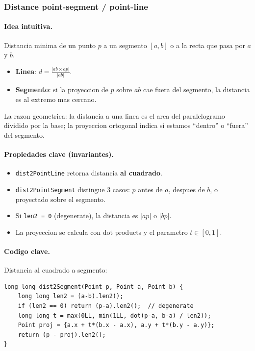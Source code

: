 ﻿\subsubsection{Distance point-segment / point-line}

\paragraph{Idea intuitiva.}
Distancia minima de un punto $p$ a un segmento $[a, b]$ o a la recta que pasa por $a$ y $b$.
\begin{itemize}\setlength\itemsep{0pt}
	\item \textbf{Linea}: $d = \frac{|ab \times ap|}{|ab|}$.
	\item \textbf{Segmento}: si la proyeccion de $p$ sobre $ab$ cae fuera del segmento, la distancia es al extremo mas cercano.
\end{itemize}
La razon geometrica: la distancia a una linea es el area del paralelogramo dividido por la base; la proyeccion ortogonal indica si estamos ``dentro'' o ``fuera'' del segmento.

\paragraph{Propiedades clave (invariantes).}
\begin{itemize}\setlength\itemsep{0pt}
	\item \texttt{dist2PointLine} retorna distancia \textbf{al cuadrado}.
	\item \texttt{dist2PointSegment} distingue 3 casos: $p$ antes de $a$, despues de $b$, o proyectado sobre el segmento.
	\item Si \texttt{len2 = 0} (degenerate), la distancia es $|ap|$ o $|bp|$.
	\item La proyeccion se calcula con dot products y el parametro $t \in [0, 1]$.
\end{itemize}

\paragraph{Codigo clave.}
Distancia al cuadrado a segmento:
\begin{verbatim}
long long dist2Segment(Point p, Point a, Point b) {
    long long len2 = (a-b).len2();
    if (len2 == 0) return (p-a).len2();  // degenerate
    long long t = max(0LL, min(1LL, dot(p-a, b-a) / len2));
    Point proj = {a.x + t*(b.x - a.x), a.y + t*(b.y - a.y)};
    return (p - proj).len2();
}
\end{verbatim}

